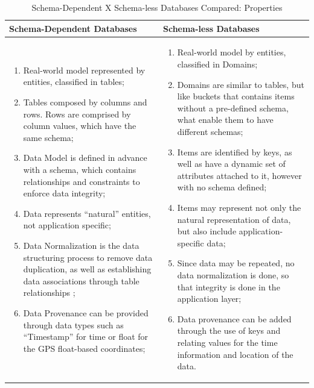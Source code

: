 \begin{table}
    \label{tab:schema-vs-schemaless}
    \caption{Schema-Dependent X Schema-less Databases Compared: Properties}
    \begin{center}
    \begin{tabular}{|p{210pt}|p{210pt}|}\hline
    Schema-Dependent Databases & Schema-less Databases\\\hline
    \begin{enumerate}
      \item Real-world model represented by entities, classified in tables;
      \item Tables composed by columns and rows. Rows are comprised by column
      values, which have the same schema;
      \item Data Model is defined in advance with a schema, which contains
      relationships and constraints to enforce data integrity;
      \item Data represents ``natural'' entities, not application specific;
      \item Data Normalization is the data structuring process to remove data
      duplication, as well as establishing data associations through table
      relationships \cite{db-normalization};
      \item Data Provenance can be provided through data types such as
      ``Timestamp'' for time or float for the GPS float-based coordinates; 
    \end{enumerate} 
    & 
    \begin{enumerate}
      \item Real-world model by entities, classified in Domains;
      \item Domains are similar to tables, but like buckets that contains items
      without a pre-defined schema, what enable them to have different schemas;
      \item Items are identified by keys, as well as have a dynamic set of
      attributes attached to it, however with no schema defined;
      \item Items may represent not only the natural representation of data, but
      also include application-specific data;
      \item Since data may be repeated, no data normalization is done, so that
      integrity is done in the application layer;
      \item Data provenance can be added through the use of keys and relating
      values for the time information and location of the data.
    \end{enumerate}
    \\\hline
    \end{tabular}
    \end{center}
\end{table}

